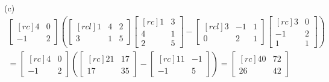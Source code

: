 \begin{solution}
(c) \ 
 \begin{eqnarray*}
\begin{bmatrix}[rc]
4&0\\
-1&2
\end{bmatrix}
\left(
\begin{bmatrix}[rcl]
1&4&2\\
3&1&5
\end{bmatrix}
\begin{bmatrix}[rc]
1&3\\
4&1\\
2&5
\end{bmatrix}
-
\begin{bmatrix}[rcl]
3&-1&1\\
0&2&1
\end{bmatrix}
\begin{bmatrix}[rc]
3&0\\
-1&2\\
1&1
\end{bmatrix}
\right)\\
= 
\begin{bmatrix}[rc]
4&0\\
-1&2
\end{bmatrix}
\left(
\begin{bmatrix}[rc]
21&17\\
17&35
\end{bmatrix}
-
\begin{bmatrix}[rc]
11&-1\\
-1&5
\end{bmatrix}
\right)
=
\begin{bmatrix}[rc]
40&72\\
26&42
\end{bmatrix}
\end{eqnarray*}




\end{solution}






